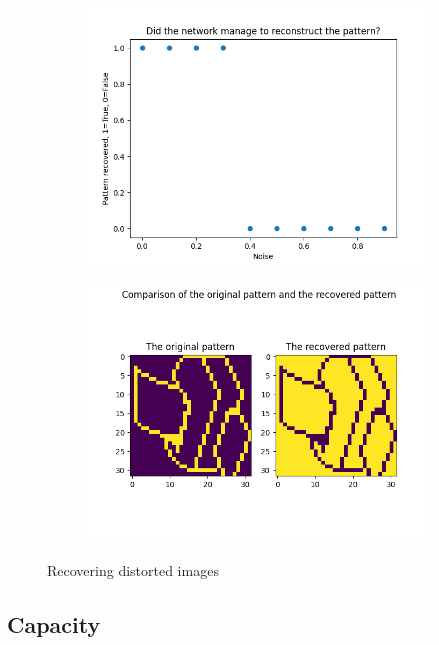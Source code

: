 \documentclass[a4paper]{article}
\begin{document}
\begin{figure}
    \centering
    \begin{subfigure}[b]{0.48\textwidth}
        \includegraphics[width=\textwidth]{Labs/Lab 3/images/distortion.png}
    \end{subfigure}
    \hfill
    \begin{subfigure}[b]{0.48\textwidth}
        \includegraphics[width=\textwidth]{Labs/Lab 3/images/inverted_pattern.png}
    \end{subfigure}
    \caption{Recovering distorted images}
    \label{fig:distortion}
\end{figure}

\subsection{Capacity}
\end{document}
